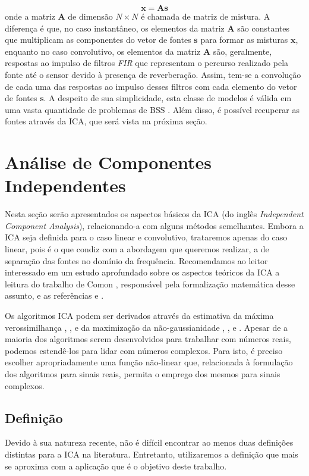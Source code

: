     \begin{equation}\label{eq:xn}
        \mathbf{x} = \mathbf{A}\mathbf{s}
    \end{equation}
    onde a matriz $\mathbf{A}$ de dimensão ${N \times N}$ é chamada de matriz de mistura. A diferença é que, no caso instantâneo, os elementos da matriz $\mathbf{A}$ são constantes que multiplicam as componentes do vetor de fontes $\mathbf{s}$ para formar as misturas $\mathbf{x}$, enquanto no caso convolutivo, os elementos da matriz $\mathbf{A}$ são, geralmente, respostas ao impulso de filtros \textit{FIR} que representam o percurso realizado pela fonte até o sensor devido à presença de reverberação. Assim, tem-se a convolução de cada uma das respostas ao impulso desses filtros com cada elemento do vetor de fontes $\mathbf{s}$. A despeito de sua simplicidade, esta classe de modelos é válida em uma vasta quantidade de problemas de BSS \cite{ICA}. Além disso, é possível recuperar as fontes através da ICA, que será vista na próxima seção.

\section{Análise de Componentes Independentes} \label{sec:ICA}
    Nesta seção serão apresentados os aspectos básicos da ICA (do inglês \textit{Independent Component Analysis}), relacionando-a com alguns métodos semelhantes. Embora a ICA seja definida para o caso linear e convolutivo, trataremos apenas do caso linear, pois é o que condiz com a abordagem que queremos realizar, a de separação das fontes no domínio da frequência. Recomendamos ao leitor interessado em um estudo aprofundado sobre os aspectos teóricos da ICA a leitura do trabalho de Comon \cite{Comon}, responsável pela formalização matemática desse assunto, e as referências \cite{ICA3} e \cite{ICA}.
    
    Os algoritmos ICA podem ser derivados através da estimativa da máxima verossimilhança \cite{ICAML}, \cite{ML}, \cite{NaturalICA} e da maximização da não-gaussianidade \cite{fastica1}, \cite{fastica2}, \cite{fastica3} e \cite{fasticaebm}. Apesar de a maioria dos algoritmos serem desenvolvidos para trabalhar com números reais, podemos estendê-los para lidar com números complexos. Para isto, é preciso escolher apropriadamente uma função não-linear que, relacionada à formulação dos algoritmos para sinais reais, permita o emprego dos mesmos para sinais complexos.

\subsection{Definição}
    Devido à sua natureza recente, não é difícil encontrar ao menos duas definições distintas para a ICA na literatura. Entretanto, utilizaremos a definição que mais se aproxima com a aplicação que é o objetivo deste trabalho.
    
